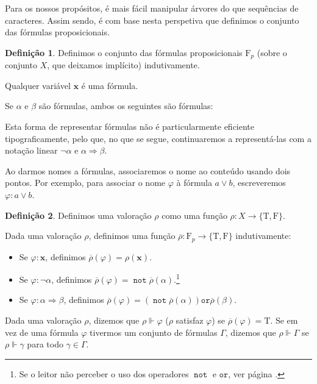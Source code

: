 \documentclass{report}
\theoremstyle{definition}
\newtheorem{definicao}{Definição}
\theoremstyle{remark}
\renewcommand{\bf}[1]{\mathbf{#1}}
\newcommand{\F}{\mathrm{F}}
\newcommand{\lt}{\mathrm{T}}
\newcommand{\lf}{\mathrm{F}}
\DeclareMathOperator{\pnot}{\texttt{not}}
\newcommand{\por}{\mathbin{\texttt{or}}}
\newcommand{\imply}{\mathbin{\Rightarrow}}
\begin{document}
	Para os nossos propósitos, é mais fácil manipular árvores do que sequências de caracteres. Assim sendo, é com base nesta perspetiva que definimos o conjunto das fórmulas proposicionais.
	
	\begin{definicao}
	Definimos o conjunto das fórmulas proposicionais $\F_p$ (sobre o conjunto $X$, que deixamos implícito) indutivamente.
	
	Qualquer variável $\bf x$ é uma fórmula.
	
	Se $\alpha$ e $\beta$ são fórmulas, ambos os seguintes são fórmulas:
	
	\begin{center}
	\hspace{3em}
	\end{center}
	
	Esta forma de representar fórmulas não é particularmente eficiente tipograficamente, pelo que, no que se segue, continuaremos a representá-las com a notação linear $\neg \alpha$ e $\alpha \imply \beta$.
	
	Ao darmos nomes a fórmulas, associaremos o nome ao conteúdo usando dois pontos. Por exemplo, para associar o nome $\varphi$ à fórmula $a \lor b$, escreveremos $\varphi : a \lor b$.
	\end{definicao}
	
	\begin{definicao}
	Definimos uma valoração $\rho$ como uma função $\rho : X \to \{\lt,\lf\}$.
	
	Dada uma valoração $\rho$, definimos uma função $\overline\rho : \F_p \to \{\lt, \lf\}$ indutivamente:
	
	\begin{itemize}
	\item Se $\varphi : \bf x$, definimos $\overline\rho(\varphi) = \rho(\bf x)$.
	
	\item Se $\varphi : \neg \alpha$, definimos $\overline\rho(\varphi) = \pnot \overline\rho(\alpha)$.\footnote{Se o leitor não perceber o uso dos operadores $\pnot$ e $\por$, ver página \pageref{tabela:operadores}.}
	
	\item Se $\varphi : \alpha \imply \beta$, definimos $\overline\rho(\varphi) = (\pnot \overline\rho(\alpha)) \por \overline\rho(\beta)$.
	\end{itemize}
	
	Dada uma valoração $\rho$, dizemos que $\rho \Vdash \varphi$ ($\rho$ satisfaz $\varphi$) se $\overline\rho(\varphi) = \lt$. Se em vez de uma fórmula $\varphi$ tivermos um conjunto de fórmulas $\Gamma$, dizemos que $\rho \Vdash \Gamma$ se $\rho \Vdash \gamma$ para todo $\gamma \in \Gamma$.
	\end{definicao}
	
\end{document}
